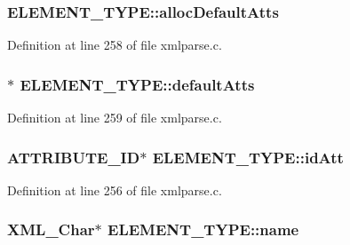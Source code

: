 \subsubsection[{\texorpdfstring{alloc\+Default\+Atts}{allocDefaultAtts}}]{ E\+L\+E\+M\+E\+N\+T\+\_\+\+T\+Y\+P\+E\+::alloc\+Default\+Atts}\hypertarget{struct_e_l_e_m_e_n_t___t_y_p_e_a4c3a11c30ad031031f7fd3676e10f546}{}\label{struct_e_l_e_m_e_n_t___t_y_p_e_a4c3a11c30ad031031f7fd3676e10f546}


Definition at line 258 of file xmlparse.\+c.

\subsubsection[{\texorpdfstring{default\+Atts}{defaultAtts}}]{$\ast$ E\+L\+E\+M\+E\+N\+T\+\_\+\+T\+Y\+P\+E\+::default\+Atts}\hypertarget{struct_e_l_e_m_e_n_t___t_y_p_e_a7f2631acfda68bac3cde4fe07ab4008e}{}\label{struct_e_l_e_m_e_n_t___t_y_p_e_a7f2631acfda68bac3cde4fe07ab4008e}


Definition at line 259 of file xmlparse.\+c.

\subsubsection[{\texorpdfstring{id\+Att}{idAtt}}]{ {\bf A\+T\+T\+R\+I\+B\+U\+T\+E\+\_\+\+ID}$\ast$ E\+L\+E\+M\+E\+N\+T\+\_\+\+T\+Y\+P\+E\+::id\+Att}\hypertarget{struct_e_l_e_m_e_n_t___t_y_p_e_a96fd1087b59b14452b385134f5568bdd}{}\label{struct_e_l_e_m_e_n_t___t_y_p_e_a96fd1087b59b14452b385134f5568bdd}


Definition at line 256 of file xmlparse.\+c.

\subsubsection[{\texorpdfstring{name}{name}}]{ {\bf X\+M\+L\+\_\+\+Char}$\ast$ E\+L\+E\+M\+E\+N\+T\+\_\+\+T\+Y\+P\+E\+::name}\hypertarget{struct_e_l_e_m_e_n_t___t_y_p_e_a2deef90a38a75ca322e5838d92e446b2}{}\label{struct_e_l_e_m_e_n_t___t_y_p_e_a2deef90a38a75ca322e5838d92e446b2}


